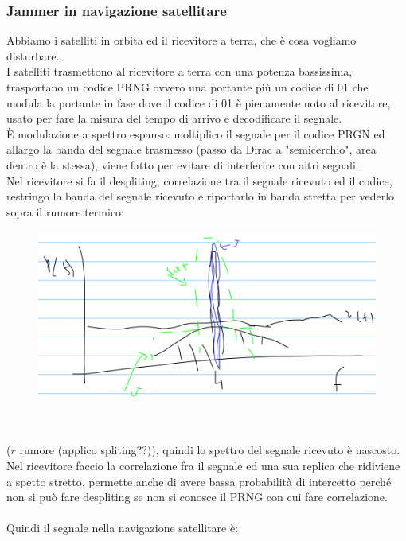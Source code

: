 \documentclass[oneside, 12pt]{extbook}
\begin{document}
\subsubsection{Jammer in navigazione satellitare}
Abbiamo i satelliti in orbita ed il ricevitore a terra, che è cosa vogliamo disturbare.\\
I satelliti trasmettono al ricevitore a terra con una potenza bassissima, trasportano un codice PRNG ovvero una portante più un codice di 01 che modula la portante in fase dove il codice di 01 è pienamente noto al ricevitore, usato per fare la misura del tempo di arrivo e decodificare il segnale.\\È modulazione a spettro espanso: moltiplico il segnale per il codice PRGN ed allargo la banda del segnale trasmesso (passo da Dirac a "semicerchio", area dentro è la stessa), viene fatto per evitare di interferire con altri segnali.\\
Nel ricevitore si fa il despliting, correlazione tra il segnale ricevuto ed il codice, restringo la banda del segnale ricevuto e riportarlo in banda stretta per vederlo sopra il rumore termico:
\\
\begin{figure}[!h]
	\includegraphics[scale=0.5]{immagini/localization/despliting.png}
\end{figure}\\\\
($r$ rumore (applico spliting??)), quindi lo spettro del segnale ricevuto è nascosto.\\
Nel ricevitore faccio la correlazione fra il segnale ed una sua replica che ridiviene a spetto stretto, permette anche di avere bassa probabilità di intercetto perché non si può fare despliting se non si conosce il PRNG con cui fare correlazione.\\\\
Quindi il segnale nella navigazione satellitare è:
\end{document}

